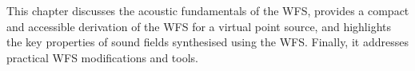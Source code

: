 This chapter discusses the acoustic fundamentals of the WFS,
provides a compact and accessible derivation of the WFS for a
virtual point source, and highlights the key properties
of sound fields synthesised using the WFS.
Finally, it addresses practical WFS modifications and tools.